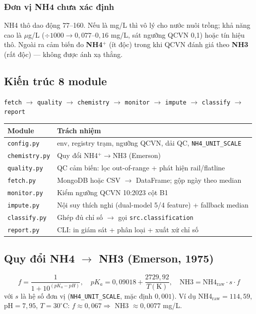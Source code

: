 \subsubsection{Đơn vị NH4 chưa xác định}
NH4 thô dao động 77--160. Nếu là mg/L thì vô lý cho nước nuôi trồng; khả năng cao là $\mu$g/L ($\div 1000 \to 0{,}077$--$0{,}16$ mg/L, sát ngưỡng QCVN 0{,}1) hoặc tín hiệu thô. Ngoài ra cảm biến đo \textbf{NH4$^+$} (ít độc) trong khi QCVN đánh giá theo \textbf{NH3} (rất độc) --- không được ánh xạ thẳng.

\subsection{Kiến trúc 8 module}
\begin{center}\small
\texttt{fetch} $\to$ \texttt{quality} $\to$ \texttt{chemistry} $\to$
\texttt{monitor} $\to$ \texttt{impute} $\to$ \texttt{classify} $\to$ \texttt{report}
\end{center}

\begin{longtable}{ll}
\toprule
\textbf{Module} & \textbf{Trách nhiệm} \\
\midrule \endhead
\texttt{config.py}    & env, registry trạm, ngưỡng QCVN, dải QC, \texttt{NH4\_UNIT\_SCALE} \\
\texttt{chemistry.py} & Quy đổi NH4$^+\to$NH3 (Emerson) \\
\texttt{quality.py}   & QC cảm biến: lọc out-of-range + phát hiện rail/flatline \\
\texttt{fetch.py}     & MongoDB hoặc CSV $\to$ DataFrame; gộp ngày theo median \\
\texttt{monitor.py}   & Kiểm ngưỡng QCVN 10:2023 cột B1 \\
\texttt{impute.py}    & Nội suy thích nghi (dual-model 5/4 feature) + fallback median \\
\texttt{classify.py}  & Ghép đủ chỉ số $\to$ gọi \texttt{src.classification} \\
\texttt{report.py}    & CLI: in giám sát + phân loại + xuất xứ chỉ số \\
\bottomrule
\end{longtable}

\subsection{Quy đổi NH4 $\to$ NH3 (Emerson, 1975)}
\begin{equation}
f = \frac{1}{1 + 10^{(pK_a - pH)}}, \quad
pK_a = 0{,}09018 + \frac{2729{,}92}{T(\text{K})}, \quad
\text{NH3} = \text{NH4}_{\text{raw}} \cdot s \cdot f
\end{equation}
với $s$ là hệ số đơn vị (\texttt{NH4\_UNIT\_SCALE}, mặc định $0{,}001$). Ví dụ NH4$_{\text{raw}}=114{,}59$, pH$=7{,}95$, $T=30^\circ$C: $f\approx0{,}067 \Rightarrow$ NH3 $\approx 0{,}0077$ mg/L.

